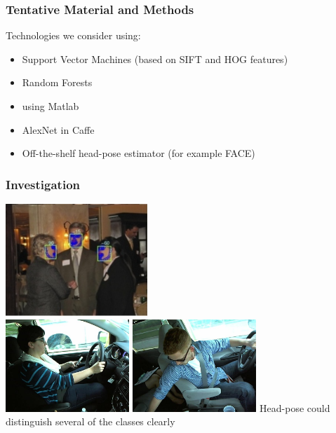 \documentclass{beamer}
\begin{document}
    \begin{frame}
        \frametitle{Tentative Material and Methods}
        Technologies we consider using:
        \begin{itemize}
            \item Support Vector Machines (based on SIFT and HOG features)
            \item Random Forests
            \item using Matlab
            \item AlexNet in Caffe
            \item Off-the-shelf head-pose estimator (for example FACE)
        \end{itemize}

    \end{frame}

    \begin{frame}
		\frametitle{Investigation}
        \begin{center}
	        \includegraphics[width=0.4\textwidth]{head-pose} \\ \vspace{0.1cm}
	        \includegraphics[width=0.35\textwidth]{img_5} \hspace{0.1cm}
	        \includegraphics[width=0.35\textwidth]{img_81}
			\newline
			Head-pose could distinguish several of the classes clearly
        \end{center}
    \end{frame}
\end{document}
